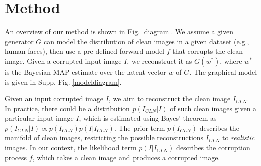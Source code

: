 \documentclass{article}
\newcommand{\fld}{results}
\begin{document}
\section{Method}



An overview of our method is shown in Fig. \ref{diagram}. We assume a given generator $G$ can model the distribution of clean images in a given dataset (e.g., human faces), then use a pre-defined forward model $f$ that corrupts the clean image. Given a corrupted input image $I$, we reconstruct it as $G(w^*)$, where $w^*$ is the Bayesian MAP estimate over the latent vector $w$ of $G$. The graphical model is given in Supp. Fig. \ref{modeldiagram}.




Given an input corrupted image $I$, we aim to reconstruct the clean image $I_{CLN}$. In practice, there could be a distribution $p(I_{CLN}|I)$ of such clean images given a particular input image $I$, which is estimated using Bayes' theorem as $p(I_{CLN}|I) \propto p(I_{CLN}) p(I|I_{CLN})$. The prior term $p(I_{CLN})$ describes the manifold of clean images, restricting the possible reconstructions $I_{CLN}$ to \emph{realistic} images. In our context, the likelihood term $p(I|I_{CLN})$ describes the corruption process $f$, which takes a clean image and produces a corrupted image. 




\newcommand{\ei}[1]{\fld/00653-recon-real-imagesffhq_test-super-resolution-orig/image#1-target} \newcommand{\eo}[1]{\fld/00653-recon-real-imagesffhq_test-super-resolution-orig/image#1-clean-step5000.jpg} \newcommand{\en}[1]{\fld/00654-recon-real-imagesffhq_test-super-resolution-nonoise/image#1-clean-step5000.jpg} \newcommand{\ew}[1]{\fld/00655-recon-real-imagesffhq_test-super-resolution-wplus/image#1-clean-step5000.jpg} \newcommand{\el}[1]{\fld/00656-recon-real-imagesffhq_test-super-resolution-l2/image#1-clean-step5000.jpg} \newcommand{\ep}[1]{\fld/00657-recon-real-imagesffhq_test-super-resolution-priorw/image#1-clean-step5000.jpg} \newcommand{\ec}[1]{\fld/00658-recon-real-imagesffhq_test-super-resolution/image#1-clean-step5000.jpg} \newcommand{\eh}[1]{\fld/00653-recon-real-imagesffhq_test-super-resolution-orig/image#1-true.jpg} 


\newcommand{\eii}[1]{\fld/00700-recon-real-imagesffhq_test-inpaint-eval/image#1-target} \newcommand{\eio}[1]{\fld/00705-recon-real-imagesffhq_test-inpaint-eval-orig/image#1-clean-step5000.jpg} \newcommand{\ein}[1]{\fld/00704-recon-real-imagesffhq_test-inpaint-eval-nonoise/image#1-clean-step5000.jpg} \newcommand{\eiw}[1]{\fld/00703-recon-real-imagesffhq_test-inpaint-eval-wplus/image#1-clean-step5000.jpg} \newcommand{\eil}[1]{\fld/00702-recon-real-imagesffhq_test-inpaint-eval-l2/image#1-clean-step5000.jpg} \newcommand{\eip}[1]{\fld/00701-recon-real-imagesffhq_test-inpaint-eval-priorw/image#1-clean-step5000.jpg} \newcommand{\eic}[1]{\fld/00700-recon-real-imagesffhq_test-inpaint-eval/image#1-clean-step5000.jpg} \newcommand{\eih}[1]{\fld/00700-recon-real-imagesffhq_test-inpaint-eval/image#1-true.jpg} 
\end{document}

